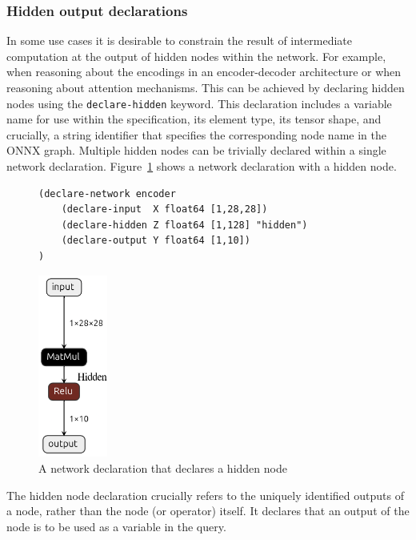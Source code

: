 \subsubsection{Hidden output declarations}
\label{sec:hidden-output-declarations}

In some use cases it is desirable to constrain the result of intermediate computation at the output of hidden nodes within the network. For example, when reasoning about the encodings in an encoder-decoder architecture or when reasoning about attention mechanisms. This can be achieved by declaring hidden nodes using the \texttt{declare-hidden} keyword. This declaration includes a variable name for use within the \vnnlib{} specification,  its element type, its tensor shape, and crucially, a string identifier that specifies the corresponding node name in the ONNX graph.  Multiple hidden nodes can be trivially declared within a single network declaration. Figure~\ref{fig:hidden-node} shows a \vnnlib{} network declaration with a hidden node.

\begin{figure}[h!]
    \begin{minipage}[c]{0.76\textwidth}
        \begin{lstlisting}[style=lbnf]   
(declare-network encoder
    (declare-input  X float64 [1,28,28])
    (declare-hidden Z float64 [1,128] "hidden")
    (declare-output Y float64 [1,10])
)\end{lstlisting}
    \end{minipage}%
    \begin{minipage}[c]{0.21\textwidth}
        \centering
        \includegraphics[height=6cm]{imgs/encoder_net.onnx.png}
    \end{minipage}
    \caption{A \vnnlib{} network declaration that declares a hidden node}
    \label{fig:hidden-node}
\end{figure}

The hidden node declaration crucially refers to the uniquely identified outputs of a node, rather than the node (or operator) itself. It declares that an output of the node is to be used as a variable in the \vnnlib{} query.

